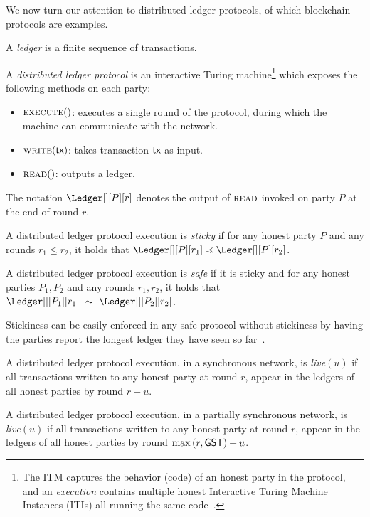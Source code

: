 We now turn our attention to distributed ledger protocols, of which blockchain protocols are examples.

\begin{definition}[Ledger]
  A \emph{ledger} is a finite sequence of transactions.
\end{definition}

\begin{definition}
  A \emph{distributed ledger protocol} is an
  interactive Turing machine\footnote{%
The ITM captures the behavior (code) of an honest party in the protocol, and
an \emph{execution} contains multiple honest Interactive Turing Machine Instances (ITIs)
all running the same code~\cite{uc}.}
  which exposes the following
  methods on each party:
  \begin{itemize}
    \item $\textsc{execute}()$: executes a single round of the protocol, during
      which the machine can communicate with the network.
    \item $\textsc{write}(\textsf{tx})$: takes transaction $\textsf{tx}$ as input.
    \item $\textsc{read}()$: outputs a ledger.
  \end{itemize}
\end{definition}

The notation
$\Ledger[][P][r]$ denotes the output of $\textsc{read}$
invoked on party $P$ at the end of round $r$.

\begin{definition}[Stickiness]
  A distributed ledger protocol execution is \emph{sticky} if
  for any honest party $P$ and any rounds $r_1 \leq r_2$,
  it holds that $\Ledger[][P][r_1] \preccurlyeq \Ledger[][P][r_2]$.
\end{definition}

\begin{definition}[Safety]
  A distributed ledger protocol execution is \emph{safe} if it is sticky and
  for any honest parties $P_1, P_2$ and any rounds $r_1, r_2$, it holds that
  $\Ledger[][P_1][r_1]~\sim~\Ledger[][P_2][r_2]$.
\end{definition}

Stickiness can be easily enforced in any safe protocol
without stickiness by having the parties report the longest
ledger they have seen so far~\cite{streamlet}.

\begin{definition}
  A distributed ledger protocol execution, in a synchronous network, is \emph{live}$(u)$ if
  all transactions written to any honest party
  at round $r$, appear in the ledgers of all honest parties by round
  $r + u$.
\end{definition}

\begin{definition}
  A distributed ledger protocol execution, in a partially synchronous network,
  is \emph{live}$(u)$ if all transactions written to any honest party
  at round $r$, appear in the ledgers of all honest parties by round
  $\max{(r,\textsf{GST})} + u$.
\end{definition}